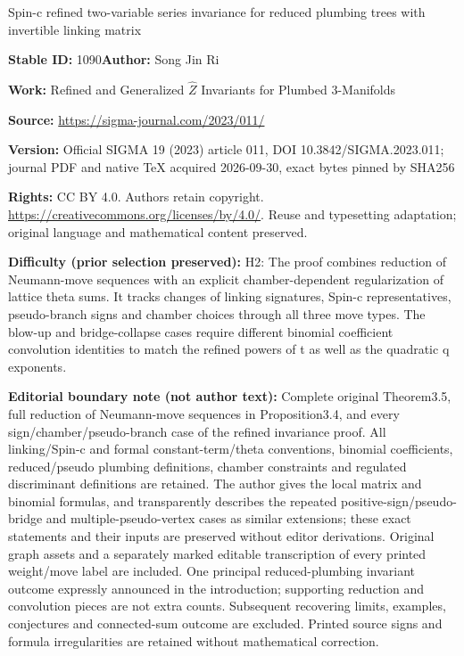 \documentclass[11pt]{article}
\numberwithin{equation}{section}
\numberwithin{equation}{section}
\begin{document}
\begin{center}\Large Spin-c refined two-variable series invariance for reduced plumbing trees with invertible linking matrix\end{center}
\noindent\textbf{Stable ID:} 1090\quad\textbf{Author:} Song Jin Ri\par
\noindent\textbf{Work:} Refined and Generalized $\hat{Z}$ Invariants for Plumbed 3-Manifolds\par
\noindent\textbf{Source:} \url{https://sigma-journal.com/2023/011/}\par
\noindent\textbf{Version:} Official SIGMA 19 (2023) article 011, DOI 10.3842/SIGMA.2023.011; journal PDF and native TeX acquired 2026-09-30, exact bytes pinned by SHA256\par
\noindent\textbf{Rights:} CC BY 4.0. Authors retain copyright. \url{https://creativecommons.org/licenses/by/4.0/}. Reuse and typesetting adaptation; original language and mathematical content preserved.\par
\noindent\textbf{Difficulty (prior selection preserved):} {\CJKfont H2: The proof combines reduction of Neumann-move sequences with an explicit chamber-dependent regularization of lattice theta sums. It tracks changes of linking signatures, Spin-c representatives, pseudo-branch signs and chamber choices through all three move types. The blow-up and bridge-collapse cases require different binomial coefficient convolution identities to match the refined powers of t as well as the quadratic q exponents.}\par
\medskip\noindent\textbf{Editorial boundary note (not author text):} Complete original Theorem3.5, full reduction of Neumann-move sequences in Proposition3.4, and every sign/chamber/pseudo-branch case of the refined invariance proof. All linking/Spin-c and formal constant-term/theta conventions, binomial coefficients, reduced/pseudo plumbing definitions, chamber constraints and regulated discriminant definitions are retained. The author gives the local matrix and binomial formulas, and transparently describes the repeated positive-sign/pseudo-bridge and multiple-pseudo-vertex cases as similar extensions; these exact statements and their inputs are preserved without editor derivations. Original graph assets and a separately marked editable transcription of every printed weight/move label are included. One principal reduced-plumbing invariant outcome expressly announced in the introduction; supporting reduction and convolution pieces are not extra counts. Subsequent recovering limits, examples, conjectures and connected-sum outcome are excluded. Printed source signs and formula irregularities are retained without mathematical correction.\par
\end{document}
